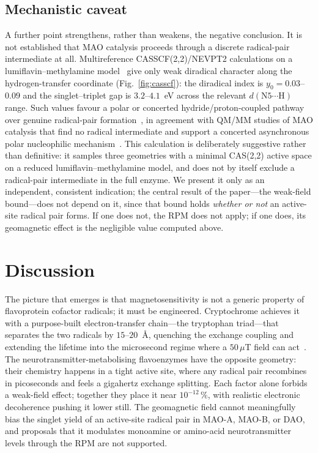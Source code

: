 \documentclass[twoside,twocolumn,9pt]{article}
\begin{document}
\subsection{Mechanistic caveat}

A further point strengthens, rather than weakens, the negative conclusion. It is
not established that MAO catalysis proceeds through a discrete radical-pair
intermediate at all. Multireference CASSCF(2,2)/NEVPT2 calculations on a
lumiflavin--methylamine model~\cite{Sun2020,Angeli2001,Nakano2017} give only weak
diradical character along the hydrogen-transfer coordinate
(Fig.~\ref{fig:casscf}): the diradical index is $y_0 = 0.03$--$0.09$ and the
singlet--triplet gap is $3.2$--$4.1$~eV across the relevant
$d(\mathrm{N5}\cdots\mathrm{H})$ range. Such values favour a polar or concerted
hydride/proton-coupled pathway over genuine radical-pair
formation~\cite{Vianello2012}, in agreement with QM/MM studies of MAO catalysis
that find no radical intermediate and support a concerted asynchronous polar
nucleophilic mechanism~\cite{Repic2013}. This calculation is deliberately
suggestive rather than definitive: it samples three geometries with a minimal
CAS(2,2) active space on a reduced lumiflavin--methylamine model, and does not by
itself exclude a radical-pair intermediate in the full enzyme. We present it only
as an independent, consistent indication; the central result of the paper---the
weak-field bound---does not depend on it, since that bound holds \emph{whether or
not} an active-site radical pair forms. If one does not, the RPM does not apply;
if one does, its geomagnetic effect is the negligible value computed above.

\section{Discussion}

The picture that emerges is that magnetosensitivity is not a generic property of
flavoprotein cofactor radicals; it must be engineered. Cryptochrome achieves it
with a purpose-built electron-transfer chain---the tryptophan triad---that
separates the two radicals by $15$--$20$~\AA, quenching the exchange coupling and
extending the lifetime into the microsecond regime where a $50\,\mu$T field can
act~\cite{Ritz2000,Maeda2012,Xu2021,Hiscock2016}. The
neurotransmitter-metabolising flavoenzymes have the opposite geometry: their
chemistry happens in a tight active site, where any radical pair recombines in
picoseconds and feels a gigahertz exchange splitting. Each factor alone forbids a
weak-field effect; together they place it near $10^{-12}\,\%$, with realistic
electronic decoherence pushing it lower still. The geomagnetic field cannot
meaningfully bias the singlet yield of an active-site radical pair in MAO-A,
MAO-B, or DAO, and proposals that it modulates monoamine or amino-acid
neurotransmitter levels through the RPM are not supported.
\end{document}
